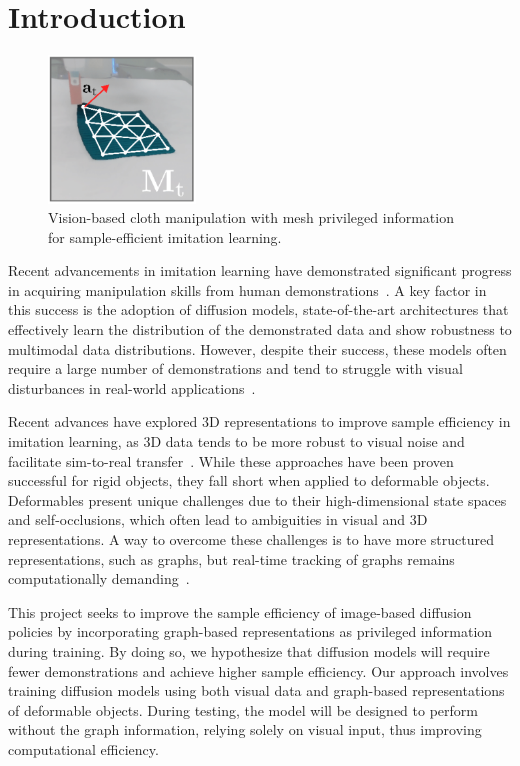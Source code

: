 \section*{Introduction}
\begin{figure} %
    \centering
    \includegraphics[width=0.35\textwidth]{images/mesh.png} %
    \caption{Vision-based cloth manipulation with mesh privileged information for sample-efficient imitation learning.}
\label{}
\end{figure}

Recent advancements in imitation learning have demonstrated significant progress in acquiring manipulation skills from human demonstrations~\cite{zhao2024aloha}. A key factor in this success is the adoption of diffusion models, state-of-the-art architectures that effectively learn the distribution of the demonstrated data and show robustness to multimodal data distributions. However, despite their success, these models often require a large number of demonstrations and tend to struggle with visual disturbances in real-world applications~\cite{ze20243d}.

Recent advances have explored 3D representations to improve sample efficiency in imitation learning, as 3D data tends to be more robust to visual noise and facilitate sim-to-real transfer~\cite{ke20243d}. While these approaches have been proven successful for rigid objects, they fall short when applied to deformable objects. Deformables present unique challenges due to their high-dimensional state spaces and self-occlusions, which often lead to ambiguities in visual and 3D representations. A way to overcome these challenges is to have more structured representations, such as graphs, but real-time tracking of graphs remains computationally demanding~\cite{longhinicloth}.

This project seeks to improve the sample efficiency of image-based diffusion policies by incorporating graph-based representations as privileged information during training. By doing so, we hypothesize that diffusion models will require fewer demonstrations and achieve higher sample efficiency. Our approach involves training diffusion models using both visual data and graph-based representations of deformable objects. During testing, the model will be designed to perform without the graph information, relying solely on visual input, thus improving computational efficiency. %

